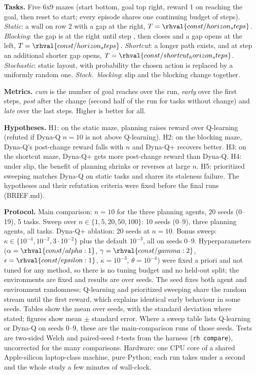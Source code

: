\textbf{Tasks.} Five 6x9 mazes (start bottom, goal top right, reward 1 on reaching the goal, then reset to start; every episode shares one continuing budget of steps). \emph{Static}: a wall on row 2 with a gap at the right, $T=\rhval{const/horizon_steps}$. \emph{Blocking}: the gap is at the right until step , then closes and a gap opens at the left, $T=\rhval{const/horizon_steps}$. \emph{Shortcut}: a longer path exists, and at step  an additional shorter gap opens, $T=\rhval{const/shortcut_horizon_steps}$. \emph{Stochastic}: static layout, with probability  the chosen action is replaced by a uniformly random one. \emph{Stoch.\ blocking}: slip  and the blocking change together.

\textbf{Metrics.} \emph{cum} is the number of goal reaches over the run, \emph{early} over the first  steps, \emph{post} after the change (second half of the run for tasks without change) and \emph{late} over the last  steps. Higher is better for all.

\textbf{Hypotheses.} H1: on the static maze, planning raises reward over Q-learning (refuted if Dyna-Q $n{=}10$ is not above Q-learning). H2: on the blocking maze, Dyna-Q's post-change reward falls with $n$ and Dyna-Q+ recovers better. H3: on the shortcut maze, Dyna-Q+ gets more post-change reward than Dyna-Q. H4: under slip, the benefit of planning shrinks or reverses at large $n$. H5: prioritized sweeping matches Dyna-Q on static tasks and shares its staleness failure. The hypotheses and their refutation criteria were fixed before the final runs (BRIEF.md).

\textbf{Protocol.} Main comparison: $n=10$ for the three planning agents, 20 seeds (0--19), 5 tasks. Sweep over $n\in\{1,5,20,50,100\}$: 10 seeds (0--9), three planning agents, all tasks. Dyna-Q+ ablation: 20 seeds at $n=10$. Bonus sweep: $\kappa\in\{10^{-4},10^{-2},3{\cdot}10^{-2}\}$ plus the default $10^{-3}$, all on seeds 0--9. Hyperparameters ($\alpha=\rhval{const/alpha:1}$, $\gamma=\rhval{const/gamma:2}$, $\epsilon=\rhval{const/epsilon:1}$, $\kappa=10^{-3}$, $\theta=10^{-4}$) were fixed a priori and not tuned for any method, so there is no tuning budget and no held-out split; the environments are fixed and results are over seeds. The seed fixes both agent and environment randomness; Q-learning and prioritized sweeping share the random stream until the first reward, which explains identical early behaviour in some seeds. Tables show the mean over seeds, with the standard deviation where stated; figures show mean $\pm$ standard error. Where a sweep table lists Q-learning or Dyna-Q on seeds 0--9, these are the main-comparison runs of those seeds. Tests are two-sided Welch and paired-seed $t$-tests from the harness (\texttt{rh compare}), uncorrected for the many comparisons. Hardware: one CPU core of a shared Apple-silicon laptop-class machine, pure Python; each run takes under a second and the whole study a few minutes of wall-clock.
